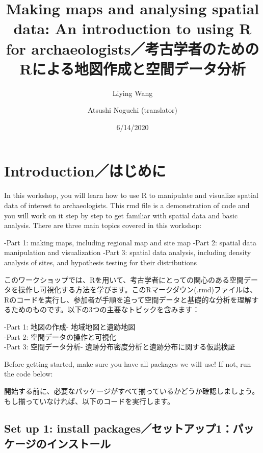 \documentclass[
  xelatex,ja=standard]{bxjsarticle}
\title{Making maps and analysing spatial data: An introduction to using R for
archaeologists／考古学者のためのRによる地図作成と空間データ分析}
\author{Liying Wang \and Atsushi Noguchi (translator)}
\date{6/14/2020}
\begin{document}
\maketitle

\hypertarget{introductionux306fux3058ux3081ux306b}{%
\section{Introduction／はじめに}\label{introductionux306fux3058ux3081ux306b}}

In this workshop, you will learn how to use R to manipulate and
visualize spatial data of interest to archaeologists. This rmd file is a
demonstration of code and you will work on it step by step to get
familiar with spatial data and basic analysis. There are three main
topics covered in this workshop:

-Part 1: making maps, including regional map and site map -Part 2:
spatial data manipulation and visualization -Part 3: spatial data
analysis, including density analysis of sites, and hypothesis testing
for their distributions

このワークショップでは、Rを用いて、考古学者にとっての関心のある空間データを操作し可視化する方法を学びます。このRマークダウン(.rmd)ファイルは、Rのコードを実行し、参加者が手順を追って空間データと基礎的な分析を理解するためのものです。以下の3つの主要なトピックを含みます：

-Part 1: 地図の作成- 地域地図と遺跡地図\\
-Part 2: 空間データの操作と可視化\\
-Part 3: 空間データ分析- 遺跡分布密度分析と遺跡分布に関する仮説検証

Before getting started, make sure you have all packages we will use! If
not, run the code below:

開始する前に、必要なパッケージがすべて揃っているかどうか確認しましょう。もし揃っていなければ、以下のコードを実行します。

\hypertarget{set-up-1-install-packagesux30bbux30c3ux30c8ux30a2ux30c3ux30d71ux30d1ux30c3ux30b1ux30fcux30b8ux306eux30a4ux30f3ux30b9ux30c8ux30fcux30eb}{%
\subsection{Set up 1: install
packages／セットアップ1：パッケージのインストール}\label{set-up-1-install-packagesux30bbux30c3ux30c8ux30a2ux30c3ux30d71ux30d1ux30c3ux30b1ux30fcux30b8ux306eux30a4ux30f3ux30b9ux30c8ux30fcux30eb}}
\end{document}
